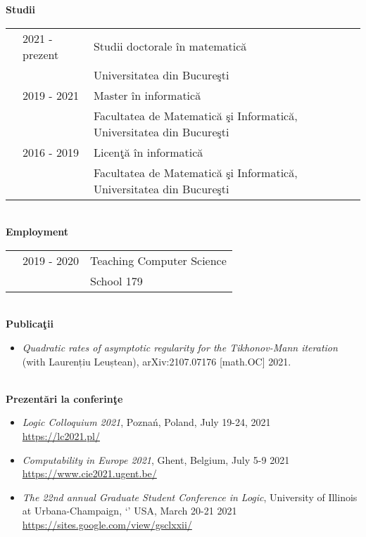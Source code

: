\documentclass[letterpaper,11pt,oneside]{article}
\begin{document}
\noindent
\Large{\textbf{Studii}} \\[3mm]
\normalsize
\begin{tabular}{@{} l l l}
    & 2021 - prezent & Studii doctorale \^{i}n matematic\u{a} \\ 
    &                & Universitatea din Bucure\c{s}ti \\
    & 2019 - 2021 & Master \^{i}n informatic\u{a} \\  
    &                & Facultatea de Matematic\u{a} \c{s}i Informatic\u{a}, Universitatea din Bucure\c{s}ti \\
    & 2016 - 2019    & Licen\c{t}\u{a} \^{i}n informatic\u{a} \\
    &                & Facultatea de Matematic\u{a} \c{s}i Informatic\u{a}, Universitatea din Bucure\c{s}ti \\

\end{tabular}
\\[3mm]

\noindent
\Large\textbf{Employment} \\[3mm]
\normalsize
\begin{tabular}{@{} l l l}
        & 2019 - 2020    & Teaching Computer Science \\
        &                & School 179 
\end{tabular}
\\[3mm]

\noindent
\Large\textbf{Publica\c{t}ii}
\normalsize
\begin{itemize}
    \item \emph{Quadratic rates of asymptotic regularity for the Tikhonov-Mann iteration} (with Laurențiu Leuștean), arXiv:2107.07176 [math.OC] 2021.
\end{itemize}
\mbox{}\\[3mm] 

\noindent
\Large{\textbf{Prezent\u{a}ri la conferin\c{t}e}} \\[3mm]
\normalsize
\begin{itemize}
    \item \emph{Logic Colloquium 2021}, 
    Pozna\'n, Poland, July 19-24, 2021 \\ 
    \url{https://lc2021.pl/}
    \item \emph{Computability in Europe 2021}, 
    Ghent, Belgium, July 5-9 2021 \\ 
    \url{https://www.cie2021.ugent.be/}
    \item \emph{The 22nd annual Graduate Student Conference in Logic}, 
    University of Illinois at Urbana-Champaign, `'
    USA, March 20-21 2021 \\ 
    \url{https://sites.google.com/view/gsclxxii/}
\end{itemize}
\mbox{}\\[3mm]
\end{document}
